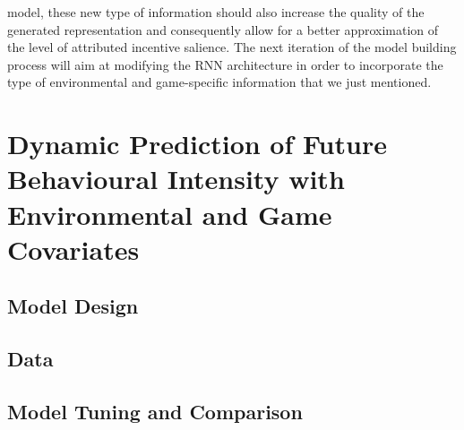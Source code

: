 model, these new type of information should also increase the quality of the generated representation and consequently allow for a better approximation of the level of attributed incentive salience. The next iteration of the model building process will aim at modifying the RNN architecture in order to incorporate the type of environmental and game-specific information that we just mentioned.

\section{Dynamic Prediction of Future Behavioural Intensity with Environmental and Game Covariates}
\label{model_architecture_3}
\lorem

\subsection{Model Design}
\label{model_design_3}
\lorem



\subsection{Data}
\label{data_3}
\lorem

\subsection{Model Tuning and Comparison}
\label{tuning_comparison_3}
\lorem

